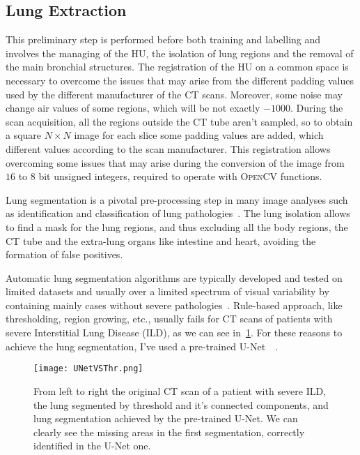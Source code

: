 \documentclass{standalone}
\begin{document}
	\subsection*{Lung Extraction}
	
	This preliminary step is performed before both training and labelling and involves the managing of the HU, the isolation of lung regions and the removal of the main bronchial structures.
	The registration of the HU on a common space is necessary to overcome the issues that may arise from the different padding values used by the different manufacturer of the CT scans. Moreover, some noise may change air values of some regions, which will be not exactly $-1000$. During the scan acquisition, all the regions outside the CT tube aren't sampled, so to obtain a square $N\times N$ image for each slice some padding values are added, which different values according to the scan manufacturer. This registration allows overcoming some issues that may arise during the conversion of the image from $16$ to $8$ bit unsigned integers, required to operate with \textsc{OpenCV} functions.

	Lung segmentation is a pivotal pre-processing step in many image analyses such as identification and classification of lung pathologies~\cite{ART:Johannes}. The lung isolation allows to find a mask for the lung regions, and thus excluding all the body regions, the CT tube and the extra-lung organs like intestine and heart, avoiding the formation of false positives.

	Automatic lung segmentation algorithms are typically developed and tested on limited datasets and usually over a limited spectrum of visual variability by containing mainly cases without severe pathologies~\cite{ART:Johannes}. Rule-based approach, like thresholding, region growing, etc., usually fails for CT scans of patients with severe Interstitial Lung Disease (ILD), as we can see in \figurename\,\ref{fig:UNetVSThr}. For these reasons to achieve the lung segmentation, I've used a pre-trained U-Net~\cite{ART:Johannes}~\cite{REP:lungmask}. 
	\begin{figure}[h!]
		\centering
		\texttt{[image: UNetVSThr.png]}
		\caption{From left to right the original CT scan of a patient with severe ILD, the lung segmented by threshold and it's connected components, and lung segmentation achieved by the pre-trained U-Net. We can clearly see the missing areas in the first segmentation, correctly identified in the U-Net one.}\label{fig:UNetVSThr}
	\end{figure}
\end{document}
